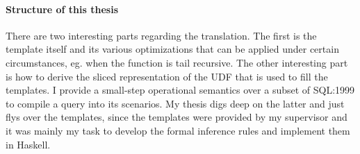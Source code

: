 \paragraph*{Structure of this thesis}
There are two interesting parts regarding the translation. The first is the template itself and its various optimizations that can be applied under certain circumstances, eg. when the function is tail recursive. The other interesting part is how to derive the sliced representation of the UDF that is used to fill the templates. I provide a small-step operational semantics over a subset of SQL:1999 to compile a query into its scenarios.
My thesis digs deep on the latter and just flys over the templates, since the templates were provided by my supervisor and it was mainly my task to develop the formal inference rules and implement them in Haskell.


